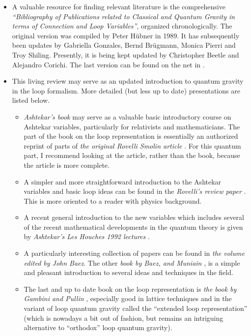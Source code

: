 \documentclass[12pt]{article}
\begin{document}
\begin{itemize}

\item A valuable resource for finding relevant literature is the 
comprehensive {\em ``Bibliography of Publications related to Classical 
and Quantum Gravity in terms of Connection and Loop Variables''}, 
organized chronologically.  The original version was compiled by 
Peter H\"ubner in 1989.  It has subsequently been updates by 
Gabriella Gonzales, Bernd Br\"ugmann, Monica Pierri and Troy 
Shiling.  Presently, it is being kept updated by Christopher 
Beetle and Alejandro Corichi.  The last version can be found on 
the net in \cite{Bibliography}.

\item This living review may serve as an updated introduction to 
quantum gravity in the loop formalism. More detailed (but less 
up to date) presentations are listed below. 
\begin{itemize}

\item {\em Ashtekar's book} \cite{AshtekarBook} may serve as a valuable 
basic introductory course on Ashtekar variables, particularly for 
relativists and mathematicians.  The part of the book on the loop 
representation is essentially an authorized reprint of parts of 
{\em the original Rovelli Smolin article} \cite{RovelliSmolin90}.  For 
this quantum part, I recommend looking at the article, rather 
than the book, because the article is more complete.

\item A simpler and more straightforward introduction to the 
Ashtekar variables and basic loop ideas can be found in the 
{\em Rovelli's review paper} \cite{Rovelli91}.  This is more oriented 
to a reader with physics background.

\item A recent general introduction to the new variables which 
includes several of the recent mathematical developments in the 
quantum theory is given by {\em Ashtekar's Les Houches 1992 lectures}  
\cite{AshtekarLesHouches}.

\item A particularly interesting collection of papers can be 
found in {\em the volume \cite{BaezBook1} edited by John Baez}.  The 
other {\em book by Baez, and Muniain} \cite{BaezBook2}, is a simple and 
pleasant introduction to several ideas and techniques in the 
field.

\item The last and up to date book on the loop representation is 
{\em the book by Gambini and Pullin} \cite{GambiniPullinBook}, 
especially good in lattice techniques and in the variant of loop 
quantum gravity called the ``extended loop representation'' 
\cite{Extended,Extended2} (which is nowadays a bit out of fashion, 
but remains an intriguing alternative to ``orthodox'' loop quantum 
gravity).


\end{itemize}
\end{itemize}
\end{document}
